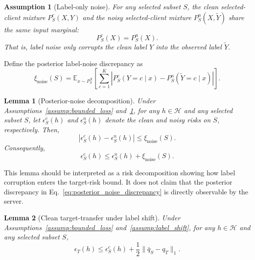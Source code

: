 \documentclass[conference]{IEEEtran}
\newtheorem{lemma}{Lemma}
\newtheorem{assumption}{Assumption}
\theoremstyle{definition}
\theoremstyle{remark}
\begin{document}
\begin{assumption}[Label-only noise]
\label{assump:label_only_noise}
For any selected subset $S$, the clean selected-client mixture $P_S^c(X,Y)$ and the noisy selected-client mixture $P_S^n(X,\widetilde Y)$ share the same input marginal:
\begin{equation}
P_S^c(X)=P_S^n(X).
\end{equation}
That is, label noise only corrupts the clean label $Y$ into the observed label $\widetilde Y$.
\end{assumption}

Define the posterior label-noise discrepancy as
\begin{equation}
\label{eq:posterior_noise_discrepancy}
\xi_{\mathrm{noise}}(S)
=
\mathbb{E}_{x\sim P_S^X}
\left[
\sum_{c=1}^{K}
\left|
P_S^c(Y=c\mid x)
-
P_S^n(\widetilde Y=c\mid x)
\right|
\right].
\end{equation}

\begin{lemma}[Posterior-noise decomposition]
\label{lem:noise_bridge}
Under Assumptions~\ref{assump:bounded_loss} and~\ref{assump:label_only_noise}, 
for any $h\in\mathcal H$ and any selected subset $S$, let
$\epsilon_S^c(h)$ and $\epsilon_S^n(h)$ denote the clean and noisy risks on $S$, respectively. Then,
\begin{equation}
\label{eq:clean_noisy_bridge}
\left|
\epsilon_S^c(h)-\epsilon_S^n(h)
\right|
\le
\xi_{\mathrm{noise}}(S).
\end{equation}
Consequently,
\begin{equation}
\epsilon_S^c(h)
\le
\epsilon_S^n(h)
+
\xi_{\mathrm{noise}}(S).
\end{equation}
\end{lemma}

This lemma should be interpreted as a risk decomposition showing how label corruption enters the target-risk bound.
It does not claim that the posterior discrepancy in Eq.~\eqref{eq:posterior_noise_discrepancy} is directly observable by the server.

\begin{lemma}[Clean target-transfer under label shift]
\label{lem:label_shift_transfer}
Under Assumptions~\ref{assump:bounded_loss} and~\ref{assump:label_shift}, for any $h\in\mathcal{H}$ and any selected subset $S$,
\begin{equation}
\label{eq:clean_transfer}
\epsilon_T(h)
\le
\epsilon_S^c(h)
+
\frac{1}{2}\|\bar q_S-q_T\|_1.
\end{equation}
\end{lemma}
\end{document}
